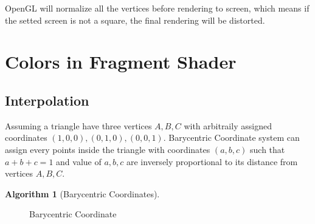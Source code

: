 \documentclass[12pt, a4paper]{article}
\theoremstyle{definition}
\newtheorem{algorithm}{Algorithm}[section]
\theoremstyle{remark}
\begin{document}
OpenGL will normalize all the vertices before rendering to screen, which means if the setted screen is not a square, the final rendering will be distorted.


\section{Colors in Fragment Shader}

\subsection{Interpolation}
Assuming a triangle have three vertices $A, B, C$ with arbitraily assigned coordinates $(1,0,0), (0,1,0),(0,0,1)$. Barycentric Coordinate system can assign every points inside the triangle with coordinates $(a,b,c)$ such that $a+b+c=1$ and value of $a,b,c$ are inversely proportional to its distance from vertices $A, B, C$.
\begin{algorithm}[Barycentric Coordinates]

\end{algorithm}

\begin{figure}[p]
\centering
{}
	\caption{Barycentric Coordinate}
\end{figure}
\end{document}
